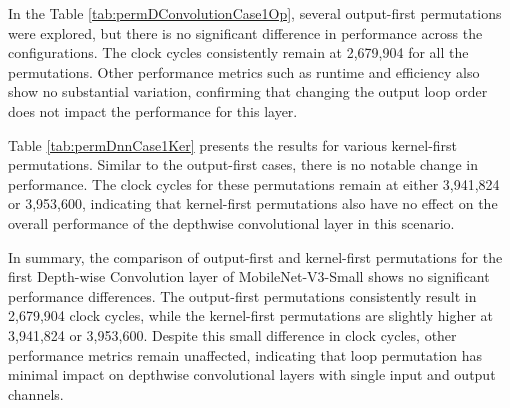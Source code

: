 In the Table \ref{tab:permDConvolutionCase1Op}, several output-first permutations were explored, but there is no significant difference in performance across the configurations. The clock cycles consistently remain at 2,679,904 for all the permutations. Other performance metrics such as runtime and efficiency also show no substantial variation, confirming that changing the output loop order does not impact the performance for this layer.
\\
\begin{table}[H]
\centering
\caption{Kernel-first permutation}
\label{tab:permDnnCase1Ker}
\end{table}

Table \ref{tab:permDnnCase1Ker} presents the results for various kernel-first permutations. Similar to the output-first cases, there is no notable change in performance. The clock cycles for these permutations remain at either 3,941,824 or 3,953,600, indicating that kernel-first permutations also have no effect on the overall performance of the depthwise convolutional layer in this scenario.

In summary, the comparison of output-first and kernel-first permutations for the first Depth-wise Convolution layer of MobileNet-V3-Small shows no significant performance differences. The output-first permutations consistently result in 2,679,904 clock cycles, while the kernel-first permutations are slightly higher at 3,941,824 or 3,953,600. Despite this small difference in clock cycles, other performance metrics remain unaffected, indicating that loop permutation has minimal impact on depthwise convolutional layers with single input and output channels.


